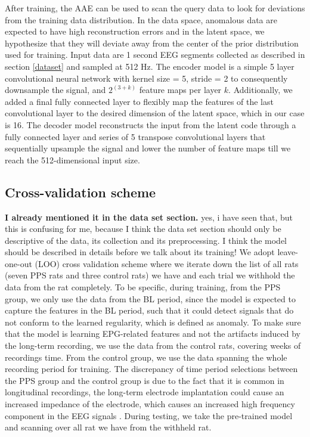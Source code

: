 \documentclass[pmlr]{jmlr}%
\begin{document}
After training, the AAE can be used to scan the query data to look for deviations from the training data distribution. In the data space, anomalous data are expected to have high reconstruction errors and in the latent space, we hypothesize that they will deviate away from the center of the prior distribution used for training.
Input data are 1 second EEG segments collected as described in section \ref{dataset} and sampled at 512 Hz. The encoder model is a simple 5 layer convolutional neural network with kernel size = 5, stride = 2 to consequently downsample the signal, and $2^{(3+k)}$ feature maps per layer $k$. Additionally, we added a final fully connected layer to flexibly map the features of the last convolutional layer to the desired dimension of the latent space, which in our case is 16. The decoder model reconstructs the input from the latent code through a fully connected layer and series of 5 transpose convolutional layers that sequentially upsample the signal and lower the number of feature maps till we reach the 512-dimensional input size.   

\subsection{Cross-validation scheme}
\textbf{I already mentioned it in the data set section.}
yes, i have seen that, but this is confusing for me, because  I think the data set section should only be descriptive of the data, its collection and its preprocessing. I think the model should be described in details before we talk about its training! 
We adopt leave-one-out (LOO) cross validation scheme where we iterate down the list of all rats (seven PPS rats and three control rats) we have and each trial we withhold the data from the rat completely. To be specific, during training, from the PPS group, we only use the data from the BL period, since the model is expected to capture the features in the BL period, such that it could detect signals that do not conform to the learned regularity, which is defined as anomaly. 
To make sure that the model is learning EPG-related features and not the artifacts induced by the long-term recording, we use the data from the control rats, covering weeks of recordings time.   
From the control group, we use the data spanning the whole recording period for training. The discrepancy of time period selections between the PPS group and the control group is due to the fact that it is common in longitudinal recordings, the long-term electrode implantation could cause an increased impedance of the electrode, which causes an increased high frequency component in the EEG signals \cite{straka2018characterizing}. During testing, we take the pre-trained model and scanning over all rat we have from the withheld rat.
\end{document}
